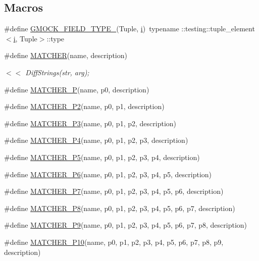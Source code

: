 \subsection*{Macros}
\begin{DoxyCompactItemize}
\item 
\#define \hyperlink{gmock-generated-matchers_8h_acf3e27de83a73f0d873da1cd471e505b}{G\+M\+O\+C\+K\+\_\+\+F\+I\+E\+L\+D\+\_\+\+T\+Y\+P\+E\+\_\+}(Tuple,  \hyperlink{gtest__output__test__golden__lin_8txt_a7e98b8a17c0aad30ba64d47b74e2a6c1}{i})~typename \+::testing\+::tuple\+\_\+element$<$\hyperlink{gtest__output__test__golden__lin_8txt_a7e98b8a17c0aad30ba64d47b74e2a6c1}{i}, Tuple$>$\+::type
\item 
\#define \hyperlink{gmock-generated-matchers_8h_af4fe73ff8e2b0494f4970b575b65ddff}{M\+A\+T\+C\+H\+ER}(name,  description)
\begin{DoxyCompactList}\small\item\em $<$$<$ Diff\+Strings(str, arg); \end{DoxyCompactList}\item 
\#define \hyperlink{gmock-generated-matchers_8h_acb7ae915efa2fd8d3f6ea7313198afb6}{M\+A\+T\+C\+H\+E\+R\+\_\+P}(name,  p0,  description)
\item 
\#define \hyperlink{gmock-generated-matchers_8h_a78efce3ad21c8f68223f5c2d09f2e79d}{M\+A\+T\+C\+H\+E\+R\+\_\+\+P2}(name,  p0,  p1,  description)
\item 
\#define \hyperlink{gmock-generated-matchers_8h_a507103c6251f8bf4393ec119d9e34d34}{M\+A\+T\+C\+H\+E\+R\+\_\+\+P3}(name,  p0,  p1,  p2,  description)
\item 
\#define \hyperlink{gmock-generated-matchers_8h_a6ec420ed6bc3ad073f19a4e32dd1f38f}{M\+A\+T\+C\+H\+E\+R\+\_\+\+P4}(name,  p0,  p1,  p2,  p3,  description)
\item 
\#define \hyperlink{gmock-generated-matchers_8h_a3a9589cd79e2dbdb4e09981510c9c42e}{M\+A\+T\+C\+H\+E\+R\+\_\+\+P5}(name,  p0,  p1,  p2,  p3,  p4,  description)
\item 
\#define \hyperlink{gmock-generated-matchers_8h_aceda758bb064965b2b9a7e0e96085861}{M\+A\+T\+C\+H\+E\+R\+\_\+\+P6}(name,  p0,  p1,  p2,  p3,  p4,  p5,  description)
\item 
\#define \hyperlink{gmock-generated-matchers_8h_a2948ce54387a83c33fa98ba0c73eb11f}{M\+A\+T\+C\+H\+E\+R\+\_\+\+P7}(name,  p0,  p1,  p2,  p3,  p4,  p5,  p6,  description)
\item 
\#define \hyperlink{gmock-generated-matchers_8h_ad86c95b03df37fada38e18d8eb9e53bc}{M\+A\+T\+C\+H\+E\+R\+\_\+\+P8}(name,  p0,  p1,  p2,  p3,  p4,  p5,  p6,  p7,  description)
\item 
\#define \hyperlink{gmock-generated-matchers_8h_a2dc1db146d4112c9fde1c2708807e43e}{M\+A\+T\+C\+H\+E\+R\+\_\+\+P9}(name,  p0,  p1,  p2,  p3,  p4,  p5,  p6,  p7,  p8,  description)
\item 
\#define \hyperlink{gmock-generated-matchers_8h_aa6a3925eeb8bcb4b6b3465cc4ff26650}{M\+A\+T\+C\+H\+E\+R\+\_\+\+P10}(name,  p0,  p1,  p2,  p3,  p4,  p5,  p6,  p7,  p8,  p9,  description)
\end{DoxyCompactItemize}

